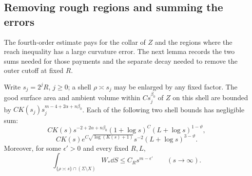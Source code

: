\subsection{Removing rough regions and summing the errors}

The fourth-order estimate pays for the collar of $Z$ and the regions
where the reach inequality has a large curvature error. The next lemma
records the two sums needed for those payments and the separate decay
needed to remove the outer cutoff at fixed $R$.

\begin{lemma}\label{lem:radial-errors}
Write $s_j=2^jR$, $j\ge0$; a shell $\rho\asymp s_j$ may be enlarged by
any fixed factor. The good surface area and ambient volume within
$C s_j^{\beta_0}$ of $Z$ on this shell are bounded by
$C K(s_j)s_j^{m-4+2\alpha+n\beta_0}$. Each of the following two shell
bounds has negligible sum:
\begin{equation}\label{eq:R3}
 C K(s)s^{-2+2\alpha+n\beta_0}(1+\log s)^C
       (L+\log s)^{1-\vartheta},
\end{equation}
\begin{equation}\label{eq:R4}
 C K(s)e^{C\sqrt{\log(K(s)+1)}}s^{-2}
       (L+\log s)^{3-\vartheta}.
\end{equation}
Moreover, for some $\epsilon'>0$ and every fixed $R,L$,
\begin{equation}\label{eq:R5}
 \int_{\{\rho\asymp s\}\cap(\Sigma\setminus X)}W_*\dd S
 \le C_Rs^{m-\epsilon'}\qquad(s\longrightarrow\infty).
\end{equation}
\end{lemma}


